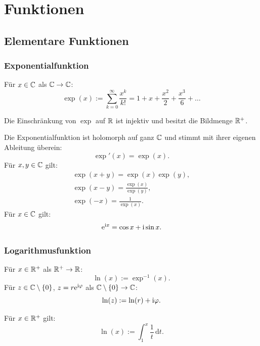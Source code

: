 
\chapter{Funktionen}
\section{Elementare Funktionen}
\subsection{Exponentialfunktion}
\begin{definition}[Exponentialfunktion]
Für $x\in\mathbb C$ als $\mathbb C\to\mathbb C$:
\begin{equation}
\exp(x) := \sum_{k=0}^{\infty} \frac{x^k}{k!}
= 1+x+\frac{x^2}{2}+\frac{x^3}{6}+\ldots
\end{equation}
\end{definition}

\noindent
{}
Die Einschränkung von $\exp$ auf $\mathbb R$ ist injektiv und
besitzt die Bildmenge $\mathbb R^+$.

Die Exponentialfunktion ist holomorph auf ganz $\mathbb C$ und stimmt
mit ihrer eigenen Ableitung überein:
\begin{equation}
\exp'(x) = \exp(x).
\end{equation}
Für $x,y\in\mathbb C$ gilt:
\begin{gather}
\exp(x+y) = \exp(x)\exp(y),\\
\exp(x-y) = \frac{\exp(x)}{\exp(y)},\\
\exp(-x) = \frac{1}{\exp(x)}.
\end{gather}
 Für $x\in\mathbb C$ gilt:
\begin{equation}
\mathrm e^{\mathrm i x} = \cos x+\mathrm i\sin x.
\end{equation}

\subsection{Logarithmusfunktion}
\begin{definition}
Für $x\in\mathbb R^+$ als $\mathbb R^+\to\mathbb R$:
\begin{equation}
\ln(x) := \exp^{-1}(x).
\end{equation}
Für $z\in\mathbb C\setminus\{0\}$, $z=r\mathrm e^{\mathrm i\varphi}$ als
$\mathbb C\setminus\{0\}\to\mathbb C$:
\begin{equation}
\ln(z):=\ln(r)+\mathrm i\varphi.
\end{equation}
\end{definition}
\noindent
{}
Für $x\in\mathbb R^+$ gilt:
\begin{equation}
\ln(x):=\int_1^x \frac{1}{t}\,\mathrm dt.
\end{equation}

